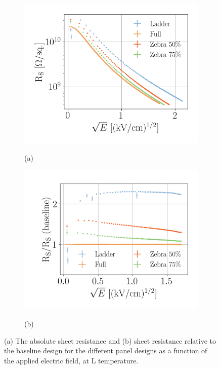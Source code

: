 \documentclass[a4paper,12pt]{article}
\begin{document}
\begin{figure}[htb]
\centering
\begin{subfigure}[c]{0.32\textheight}
\begin{center}
    \includegraphics[width=\textwidth]{r_vs_e_0-5_dr8_multiple_ln2.png}
    
    \vspace*{-\baselineskip} \hspace{1em} (a)
\end{center}
\end{subfigure}
\begin{subfigure}[c]{0.32\textheight}
\begin{center}
    \includegraphics[width=\textwidth]{r_s_vs_e_0-5_dr8_multiple_ln2_ratio.png}
    
    \vspace*{-\baselineskip} \hspace{2em} (b)
\end{center}
\end{subfigure}
\caption{(a) The absolute sheet resistance and (b) sheet resistance relative to the baseline design for the different panel designs as a function of the applied electric field, at L temperature.} 
\label{fig:alt_design_res}
\end{figure}
\end{document}
